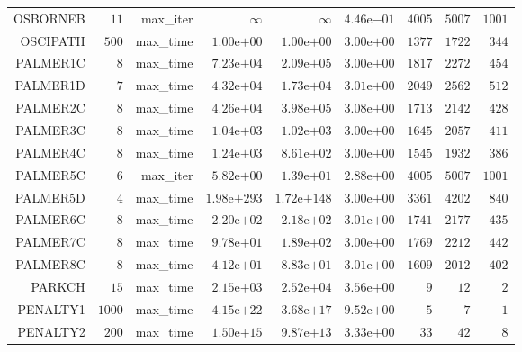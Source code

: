 \begin{longtable}{rrrrrrrrr}
OSBORNEB & \(    11\) & max\_iter & \(\infty\) & \(\infty\) & \( 4.46\)e\(-01\) & \(  4005\) & \(  5007\) & \(  1001\) \\
OSCIPATH & \(   500\) & max\_time & \( 1.00\)e\(+00\) & \( 1.00\)e\(+00\) & \( 3.00\)e\(+00\) & \(  1377\) & \(  1722\) & \(   344\) \\
PALMER1C & \(     8\) & max\_time & \( 7.23\)e\(+04\) & \( 2.09\)e\(+05\) & \( 3.00\)e\(+00\) & \(  1817\) & \(  2272\) & \(   454\) \\
PALMER1D & \(     7\) & max\_time & \( 4.32\)e\(+04\) & \( 1.73\)e\(+04\) & \( 3.01\)e\(+00\) & \(  2049\) & \(  2562\) & \(   512\) \\
PALMER2C & \(     8\) & max\_time & \( 4.26\)e\(+04\) & \( 3.98\)e\(+05\) & \( 3.08\)e\(+00\) & \(  1713\) & \(  2142\) & \(   428\) \\
PALMER3C & \(     8\) & max\_time & \( 1.04\)e\(+03\) & \( 1.02\)e\(+03\) & \( 3.00\)e\(+00\) & \(  1645\) & \(  2057\) & \(   411\) \\
PALMER4C & \(     8\) & max\_time & \( 1.24\)e\(+03\) & \( 8.61\)e\(+02\) & \( 3.00\)e\(+00\) & \(  1545\) & \(  1932\) & \(   386\) \\
PALMER5C & \(     6\) & max\_iter & \( 5.82\)e\(+00\) & \( 1.39\)e\(+01\) & \( 2.88\)e\(+00\) & \(  4005\) & \(  5007\) & \(  1001\) \\
PALMER5D & \(     4\) & max\_time & \(1.98\)e\(+293\) & \(1.72\)e\(+148\) & \( 3.00\)e\(+00\) & \(  3361\) & \(  4202\) & \(   840\) \\
PALMER6C & \(     8\) & max\_time & \( 2.20\)e\(+02\) & \( 2.18\)e\(+02\) & \( 3.01\)e\(+00\) & \(  1741\) & \(  2177\) & \(   435\) \\
PALMER7C & \(     8\) & max\_time & \( 9.78\)e\(+01\) & \( 1.89\)e\(+02\) & \( 3.00\)e\(+00\) & \(  1769\) & \(  2212\) & \(   442\) \\
PALMER8C & \(     8\) & max\_time & \( 4.12\)e\(+01\) & \( 8.83\)e\(+01\) & \( 3.01\)e\(+00\) & \(  1609\) & \(  2012\) & \(   402\) \\
PARKCH & \(    15\) & max\_time & \( 2.15\)e\(+03\) & \( 2.52\)e\(+04\) & \( 3.56\)e\(+00\) & \(     9\) & \(    12\) & \(     2\) \\
PENALTY1 & \(  1000\) & max\_time & \( 4.15\)e\(+22\) & \( 3.68\)e\(+17\) & \( 9.52\)e\(+00\) & \(     5\) & \(     7\) & \(     1\) \\
PENALTY2 & \(   200\) & max\_time & \( 1.50\)e\(+15\) & \( 9.87\)e\(+13\) & \( 3.33\)e\(+00\) & \(    33\) & \(    42\) & \(     8\) \\

\end{longtable}
